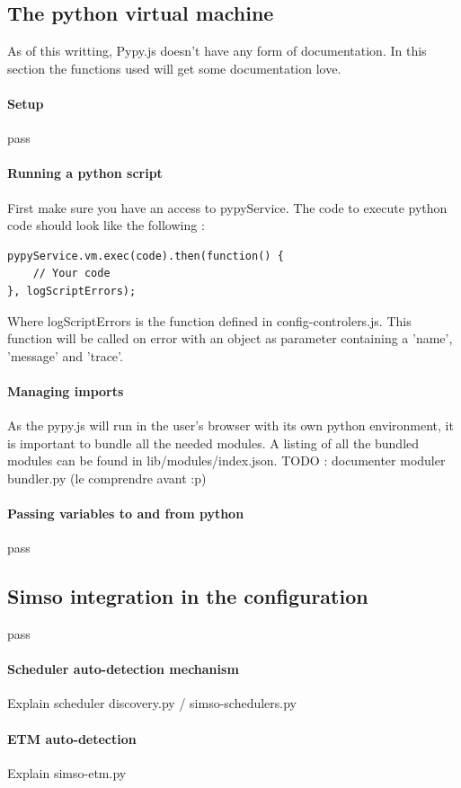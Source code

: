 \documentclass[10pt,a4paper]{article}
\begin{document}
\subsection{The python virtual machine}
As of this writting, Pypy.js doesn't have any form of documentation. In this section the functions used will get some documentation love. 
\paragraph{Setup}
pass
\paragraph{Running a python script}
First make sure you have an access to pypyService. The code to execute python code should look like the following : 
\lstset{language=python}
\begin{lstlisting}
pypyService.vm.exec(code).then(function() {
	// Your code
}, logScriptErrors);
\end{lstlisting}
Where logScriptErrors is the function defined in config-controlers.js. This function will be called on error with an object as parameter containing a 'name', 'message' and 'trace'.

\paragraph{Managing imports}
As the pypy.js will run in the user's browser with its own python environment, it is important to bundle all the needed modules.
A listing of all the bundled modules can be found in lib/modules/index.json.
TODO : documenter moduler bundler.py (le comprendre avant :p)

\paragraph{Passing variables to and from python}
pass

\subsection{Simso integration in the configuration}
pass

\paragraph{Scheduler auto-detection mechanism}
Explain scheduler discovery.py / simso-schedulers.py


\paragraph{ETM auto-detection}
Explain simso-etm.py
\end{document}
